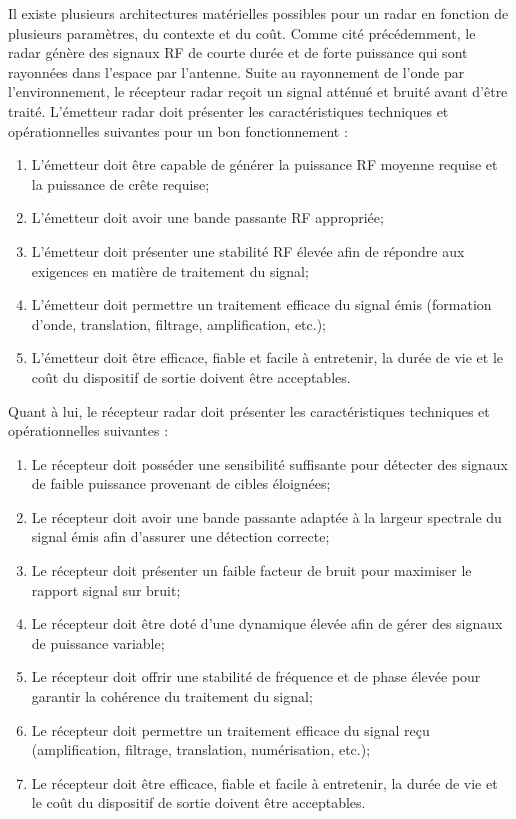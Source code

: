 Il existe plusieurs architectures matérielles possibles pour un radar en fonction de plusieurs paramètres, du contexte et du coût. Comme cité précédemment, le radar génère des signaux RF de courte durée et de forte puissance qui sont rayonnées dans l'espace par l'antenne. Suite au rayonnement de l'onde par l'environnement, le récepteur radar reçoit un signal atténué et bruité avant d'être traité. 
L'émetteur radar doit présenter les caractéristiques techniques et opérationnelles suivantes pour un bon fonctionnement :
\begin{enumerate}
    \item L'émetteur doit être capable de générer la puissance RF moyenne requise et la puissance de crête requise;
    \item L'émetteur doit avoir une bande passante RF appropriée;
    \item L'émetteur doit présenter une stabilité RF élevée afin de répondre aux exigences en matière de traitement du signal;
    \item L'émetteur doit permettre un traitement efficace du signal émis (formation d'onde, translation, filtrage, amplification, etc.);
    \item L'émetteur doit être efficace, fiable et facile à entretenir, la durée de vie et le coût du dispositif de sortie doivent être acceptables.
\end{enumerate}
Quant à lui, le récepteur radar doit présenter les caractéristiques techniques et opérationnelles suivantes :
\begin{enumerate}
  \item Le récepteur doit posséder une sensibilité suffisante pour détecter des signaux de faible puissance provenant de cibles éloignées;
  \item Le récepteur doit avoir une bande passante adaptée à la largeur spectrale du signal émis afin d'assurer une détection correcte;
  \item Le récepteur doit présenter un faible facteur de bruit pour maximiser le rapport signal sur bruit;
  \item Le récepteur doit être doté d'une dynamique élevée afin de gérer des signaux de puissance variable;
  \item Le récepteur doit offrir une stabilité de fréquence et de phase élevée pour garantir la cohérence du traitement du signal;
  \item Le récepteur doit permettre un traitement efficace du signal reçu (amplification, filtrage, translation, numérisation, etc.);
  \item Le récepteur doit être efficace, fiable et facile à entretenir, la durée de vie et le coût du dispositif de sortie doivent être acceptables.
\end{enumerate}

